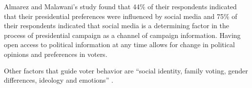 Almarez and Malawani’s \cite{Almarez-2016} study found that 44\% of their respondents indicated that their presidential preferences were influenced by social media and 75\% of their respondents indicated that social media is a determining factor in the process of presidential campaign as a channel of campaign information. Having open access to political information at any time allows for change in political opinions and preferences in voters.

Other factors that guide voter behavior are “social identity, family voting, gender differences, ideology and emotions” \cite{Qorri-2018}.
